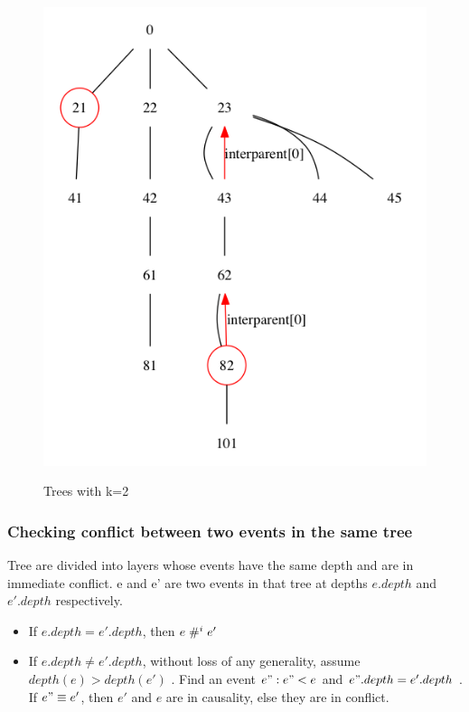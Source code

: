 \documentclass{llncs}
\begin{document}
\begin{figure}
{\includegraphics[scale=0.3]{tree1.png}
}
\label{fig:example}
\caption{Trees with k=2}
\end{figure}

\subsubsection{Checking conflict between two events in the same tree}
Tree are divided into layers whose events have the same depth and are in immediate conflict.
e and e' are two events in that tree at depths $e.depth$ and $e'.depth$ respectively.
\begin{itemize}
\item
	If $e.depth = e'.depth$, then $e \mathrel{\#^i_{}} e'$
\item
	If $e.depth \neq e'.depth$, without loss of any generality, assume $ depth(e) > depth(e')$ . Find an event $e": e" < e$ and $e".depth = e'.depth$ . If $e" \equiv e'$, then $e'$ and $e$ are in causality, else they are in conflict.
\end{itemize}
\end{document}
